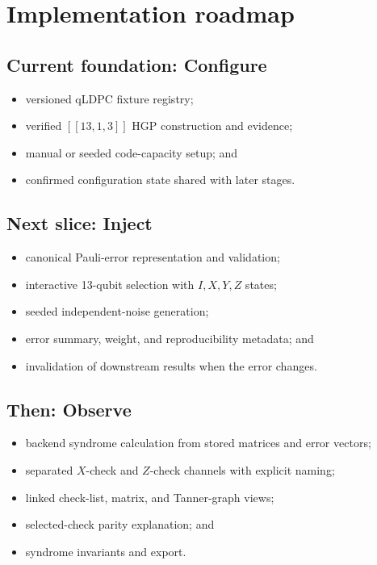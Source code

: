 \documentclass[11pt,letterpaper]{article}
\begin{document}
\section{Implementation roadmap}

\subsection{Current foundation: Configure}

\begin{itemize}
  \item versioned qLDPC fixture registry;
  \item verified $[[13,1,3]]$ HGP construction and evidence;
  \item manual or seeded code-capacity setup; and
  \item confirmed configuration state shared with later stages.
\end{itemize}

\subsection{Next slice: Inject}

\begin{itemize}
  \item canonical Pauli-error representation and validation;
  \item interactive 13-qubit selection with $I,X,Y,Z$ states;
  \item seeded independent-noise generation;
  \item error summary, weight, and reproducibility metadata; and
  \item invalidation of downstream results when the error changes.
\end{itemize}

\subsection{Then: Observe}

\begin{itemize}
  \item backend syndrome calculation from stored matrices and error vectors;
  \item separated $X$-check and $Z$-check channels with explicit naming;
  \item linked check-list, matrix, and Tanner-graph views;
  \item selected-check parity explanation; and
  \item syndrome invariants and export.
\end{itemize}
\end{document}
